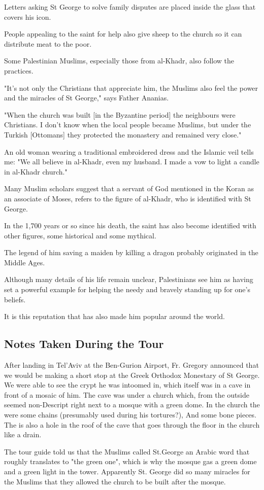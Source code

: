 \documentclass[letterpaper]{report}
\begin{document}
\begin{multicols}{2}
Letters asking St George to solve family disputes are placed inside the glass that covers his icon.

People appealing to the saint for help also give sheep to the church so it can distribute meat to the poor.

Some Palestinian Muslims, especially those from al-Khadr, also follow the practices.

"It's not only the Christians that appreciate him, the Muslims also feel the power and the miracles of St George," says Father Ananias.

"When the church was built [in the Byzantine period] the neighbours were Christians. I don't know when the local people became Muslims, but under the Turkish [Ottomans] they protected the monastery and remained very close."

An old woman wearing a traditional embroidered dress and the Islamic veil tells me: "We all believe in al-Khadr, even my husband. I made a vow to light a candle in al-Khadr church."

Many Muslim scholars suggest that a servant of God mentioned in the Koran as an associate of Moses, refers to the figure of al-Khadr, who is identified with St George.

In the 1,700 years or so since his death, the saint has also become identified with other figures, some historical and some mythical.

The legend of him saving a maiden by killing a dragon probably originated in the Middle Ages.

Although many details of his life remain unclear, Palestinians see him as having set a powerful example for helping the needy and bravely standing up for one's beliefs.

It is this reputation that has also made him popular around the world.

\subsection{Notes Taken During the Tour}
After landing in Tel'Aviv at the Ben-Gurion Airport, Fr. Gregory announced that we would be making a short stop at the Greek Orthodox Monestary of St George. We were able to see the crypt he was intoomed in, which itself was in a cave in front of a mosaic of him. The cave was under a church which, from the outside seemed non-Descript right next to a mosque with a green dome. In the church the were some chains (presumably used during his tortures?), And some bone pieces. The is also a hole in the roof of the cave that goes through the floor in the church like a drain.

The tour guide told us that the Muslims called St.George an Arabic word that roughly translates to "the green one", which is why the mosque gas a green dome and a green light in the tower. Apparently St. George did so many miracles for the Muslims that they allowed the church to be built after the mosque.
\end{multicols}
\end{document}
